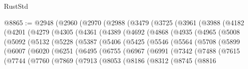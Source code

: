\begin{lexlean}{RustStd}
\begin{coremodule}
@8865 := @2948
    (@2960
      (@2970
        (@2988
          (@3479
            (@3725
              (@3961
                (@3988
                  (@4182
                    (@4201
                      (@4279
                        (@4305
                          (@4361
                            (@4389
                              (@4692
                                (@4868
                                  (@4935
                                    (@4965
                                      (@5008
                                        (@5092
                                          (@5132
                                            (@5228
                                              (@5387
                                                (@5406
                                                  (@5425
                                                    (@5546
                                                      (@5564
                                                        (@5708
                                                          (@5899
                                                            (@6007
                                                              (@6020
                                                                (@6251
                                                                  (@6495
                                                                    (@6755
                                                                      (@6967
                                                                        (@6991
                                                                          (@7342
                                                                            (@7488
                                                                              (@7615
                                                                                (@7744
                                                                                  (@7760
                                                                                    (@7869
                                                                                      (@7913
                                                                                        (@8053
                                                                                          (@8186
                                                                                            (@8312
                                                                                              (@8745
                                                                                                (@8816

\end{coremodule}
\end{lexlean}
